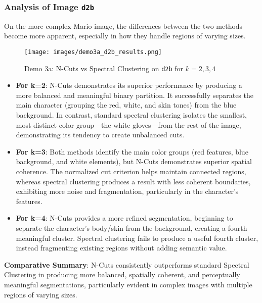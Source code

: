\documentclass[12pt,a4paper]{article}
\begin{document}
{\subsubsection{Analysis of Image \texttt{d2b}}

On the more complex Mario image, the differences between the two methods become more apparent, especially in how they handle regions of varying sizes.


\begin{figure}[H]
    \centering
    \texttt{[image: images/demo3a\_d2b\_results.png]}
    \caption{Demo 3a: N-Cuts vs Spectral Clustering on \texttt{d2b} for $k=2,3,4$}
    \label{fig:demo3a_d2b_results}
\end{figure}


\begin{itemize}

    \item \textbf{For k=2}: N-Cuts demonstrates its superior performance by producing a more balanced and meaningful binary partition. It successfully separates the main character (grouping the red, white, and skin tones) from the blue background. In contrast, standard spectral clustering isolates the smallest, most distinct color group—the white gloves—from the rest of the image, demonstrating its tendency to create unbalanced cuts.

    \item \textbf{For k=3}: Both methods identify the main color groups (red features, blue background, and white elements), but N-Cuts demonstrates superior spatial coherence. The normalized cut criterion helps maintain connected regions, whereas spectral clustering produces a result with less coherent boundaries, exhibiting more noise and fragmentation, particularly in the character's features.
    
    \item \textbf{For k=4}: N-Cuts provides a more refined segmentation, beginning to separate the character's body/skin from the background, creating a fourth meaningful cluster. Spectral clustering fails to produce a useful fourth cluster, instead fragmenting existing regions without adding semantic value. 
\end{itemize}

\textbf{Comparative Summary}: N-Cuts consistently outperforms standard Spectral Clustering in producing more balanced, spatially coherent, and perceptually meaningful segmentations, particularly evident in complex images with multiple regions of varying sizes.


}
\end{document}

